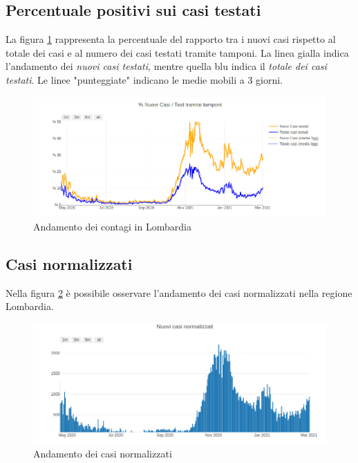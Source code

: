 \subsection{Percentuale positivi sui casi testati}
La figura \ref{fig:positivi_testati_lomb} rappresenta la percentuale del rapporto tra i nuovi casi rispetto al totale dei casi e al numero dei casi testati tramite tamponi.
La linea gialla indica l'andamento dei \emph{nuovi casi testati}, mentre quella blu indica il \emph{totale dei casi testati}.
Le linee "punteggiate" indicano le medie mobili a 3 giorni.
\begin{figure}[htp]
    \centering
    \includegraphics[width=12cm]{img/lomb/casi_tamp_lomb.png}
    \caption{Andamento dei contagi in Lombardia}
    \label{fig:positivi_testati_lomb}
\end{figure}

\subsection{Casi normalizzati}
Nella figura \ref{fig:casi_norm_lomb} è possibile osservare l'andamento dei casi normalizzati nella regione Lombardia.
\begin{figure}[htp]
    \centering
    \includegraphics[width=14cm]{img/lomb/casi_norm_lomb.png}
    \caption{Andamento dei casi normalizzati}
    \label{fig:casi_norm_lomb}
\end{figure}

